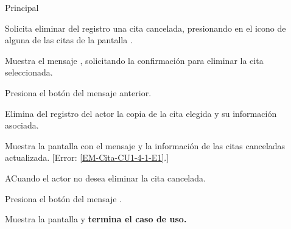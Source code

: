 \begin{UCtrayectoria}{Principal}

	\UCpaso [\UCactor] Solicita eliminar del registro una cita cancelada, presionando en el icono  de alguna de las citas de la pantalla .

	\UCpaso Muestra el mensaje , solicitando la confirmación para eliminar la cita seleccionada. 

	\UCpaso Presiona el botón  del mensaje anterior.  
 
	\UCpaso Elimina del registro del actor la copia de la cita elegida y su información asociada. 

	\UCpaso Muestra la pantalla  con el mensaje  y la información de las citas canceladas actualizada. [Error: \ref{EM-Cita-CU1-4-1-E1}.]
	

\end{UCtrayectoria}

\begin{UCtrayectoriaA}{A}{Cuando el actor no desea eliminar la cita cancelada.}

	\UCpaso Presiona el botón  del mensaje .

	\UCpaso Muestra la pantalla  y \textbf{termina el caso de uso.}

\end{UCtrayectoriaA}